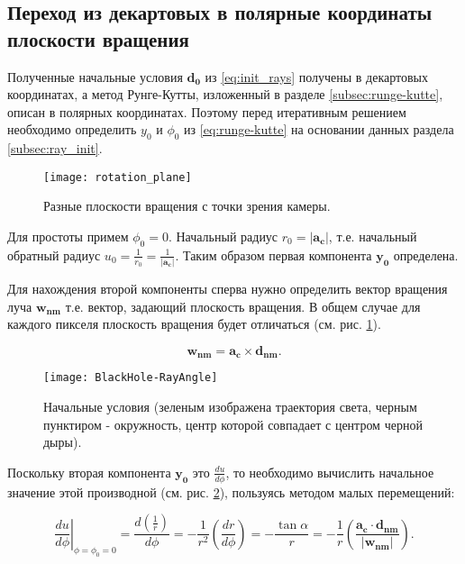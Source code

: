 \subsection{Переход из декартовых в полярные координаты плоскости вращения}
\label{subsec:transition_from_decart_to_polar}

Полученные начальные условия $\mathbf{d_0}$ из \eqref{eq:init_rays} получены в декартовых координатах, а метод Рунге-Кутты, изложенный в разделе \ref{subsec:runge-kutte}, описан в полярных координатах. Поэтому перед итеративным решением необходимо определить $y_0$ и $\phi_0$ из \eqref{eq:runge-kutte} на основании данных раздела \ref{subsec:ray_init}.

\newpage

\begin{figure}[h]
    \centering
    \texttt{[image: rotation\_plane]}
    \caption{Разные плоскости вращения с точки зрения камеры.}
    \label{fig:rotation_plane}
\end{figure}

Для простоты примем $\phi_0 = 0$. Начальный радиус $r_0 = |\mathbf{a_c}|$, т.е. начальный обратный радиус $u_0 = \frac{1}{r_0} = \frac{1}{|\mathbf{a_c}|}$. Таким образом первая компонента $\mathbf{y_0}$ определена.

Для нахождения второй компоненты сперва нужно определить вектор вращения луча $\mathbf{w_{nm}}$ т.е. вектор, задающий плоскость вращения. В общем случае для каждого пикселя плоскость вращения будет отличаться (см. рис. \ref{fig:rotation_plane}).

\begin{equation}
\label{eq:w_ray}
    \mathbf{w_{nm}} = \mathbf{a_c} \times \mathbf{d_{nm}}.
\end{equation}

\newpage

\begin{figure}[h]
    \centering
    \texttt{[image: BlackHole-RayAngle]}
    \caption{Начальные условия (зеленым изображена траектория света, черным пунктиром - окружность, центр которой совпадает с центром черной дыры).}
    \label{fig:blackhole_rayAngle}
\end{figure}

Поскольку вторая компонента $\mathbf{y_0}$ это $\frac{du}{d\phi}$, то необходимо вычислить начальное значение этой производной (см. рис. \ref{fig:blackhole_rayAngle}), пользуясь методом малых перемещений:

\begin{equation}
\label{eq:dudr_init}
    \left.\frac{du}{d\phi}\right|_{\phi=\phi_0=0} = \frac{d\left(\frac{1}{r}\right)}{d\phi} = -\frac{1}{r^2}\left(\frac{dr}{d\phi}\right) = -\frac{\tan{\alpha}}{r} = -\frac{1}{r}\left(\frac{\mathbf{a_c} \cdot \mathbf{d_{nm}}}{\left|\mathbf{w_{nm}}\right|}\right).
\end{equation}

